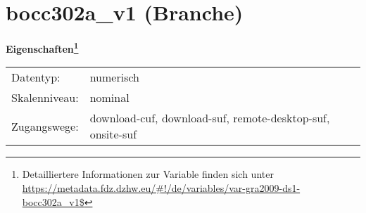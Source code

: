 
    \setcounter{footnote}{0}

    \vspace*{-1.8cm}
	\section{bocc302a\_v1 (Branche)}
	\label{section:bocc302a_v1}



    \vspace*{0.5cm}
    \noindent\textbf{Eigenschaften\footnote{Detailliertere Informationen zur Variable finden sich unter
		\url{https://metadata.fdz.dzhw.eu/\#!/de/variables/var-gra2009-ds1-bocc302a_v1$}}}\\
	\begin{tabularx}{\hsize}{@{}lX}
	Datentyp: & numerisch \\
	Skalenniveau: & nominal \\
	Zugangswege: &
	  download-cuf, 
	  download-suf, 
	  remote-desktop-suf, 
	  onsite-suf
 \\
    \end{tabularx}



